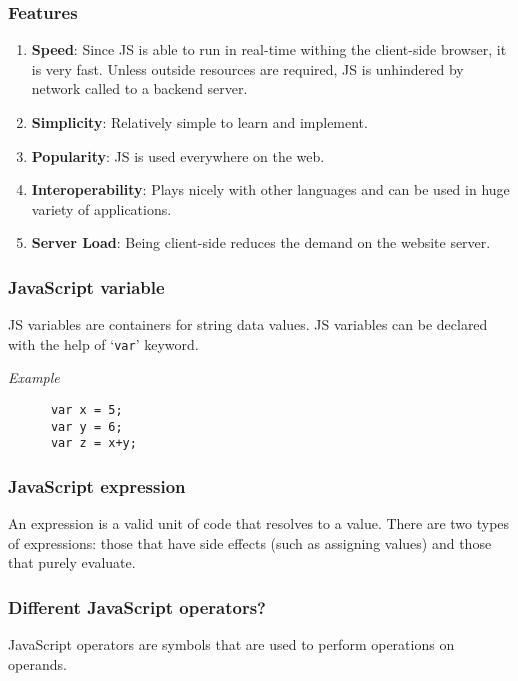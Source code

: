 \documentclass[a4paper]{article}
\begin{document}
    \subsubsection{Features}%
      \begin{enumerate}
        \item \textbf{Speed}: Since JS is able to run in real-time 
          withing the client-side browser, it is very fast. Unless
          outside resources are required, JS is unhindered by 
          network called to a backend server.
        \item \textbf{Simplicity}: Relatively simple to learn 
          and implement.
        \item \textbf{Popularity}: JS is used everywhere on the 
          web.
        \item \textbf{Interoperability}: Plays nicely with other 
          languages and can be used in huge variety of applications.
        \item \textbf{Server Load}: Being client-side reduces the
          demand on the website server.
      \end{enumerate}%

    \subsubsection{JavaScript variable}%
    JS variables are containers for string data values. JS variables
    can be declared with the help of `\texttt{var}' keyword.

    \emph{Example}
    \begin{lstlisting}
      var x = 5;
      var y = 6;
      var z = x+y;
    \end{lstlisting}%

    \subsubsection{JavaScript expression}%
    An expression is a valid unit of code that resolves to a value.
    There are two types of expressions: those that have side effects
    (such as assigning values) and those that purely evaluate.%

    \subsubsection{Different JavaScript operators?}%
    JavaScript operators are symbols that are used to perform 
    operations on operands.
\end{document}
